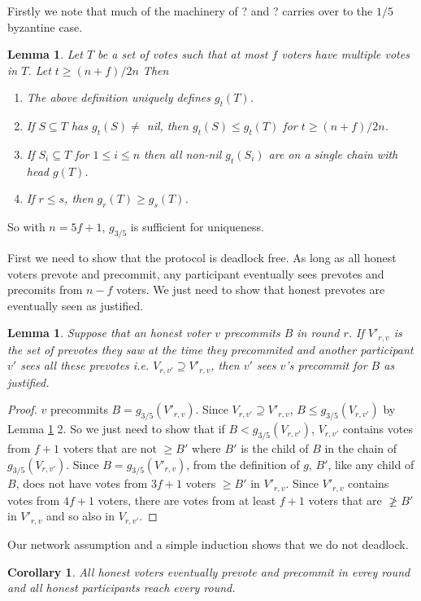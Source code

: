 \documentclass{article}
\newtheorem{lemma}[theorem]{Lemma}
\newtheorem{corollary}[theorem]{Corollary}
\begin{document}
Firstly we note that much of the machinery of ? and ? carries over to the $1/5$ byzantine case.

\begin{lemma} \label{lem:ghost-monotonicity-general}
Let $T$ be a set of votes such that at most $f$ voters have multiple votes in $T$. Let $t \geq (n+f)/2n$ Then
\begin{enumerate}
\item The above definition uniquely defines $g_t(T)$.
\item If $S \subseteq T$ has $g_t(S) \neq$ nil, then $g_t(S) \leq g_t(T)$ for $t \geq (n+f)/2n$.
\item If $S_i \subseteq T$ for $1 \leq i \leq n$ then all non-nil $g_t(S_i)$ are on a single chain with head $g(T)$.
\item If $r \leq s$, then $g_r(T) \geq g_s(T)$.
\end{enumerate}
\end{lemma}
So with $n=5f+1$, $g_{3/5}$ is sufficient for uniqueness.

First we need to show that the protocol is deadlock free.
As long as all honest voters prevote and precommit, any participant eventually sees prevotes and precomits from $n-f$ voters. We just need to show that honest prevotes are eventually seen as justified.
\begin{lemma} Suppose that an honest voter $v$ precommits $B$ in round $r$. If $V'_{r,v}$ is the set of prevotes they saw at the time they precommited and another participant $v'$ sees all these prevotes i.e. $V_{r,v'} \supseteq V'_{r,v}$, then $v'$ sees $v$'s precommit for $B$ as justified. \end{lemma}
\begin{proof} $v$ precommits $B = g_{3/5}(V'_{r,v})$. Since $V_{r,v'} \supseteq V'_{r,v}$, $B \leq g_{3/5}(V_{r,v'})$ by Lemma \ref{lem:ghost-monotonicity-general} 2.
So we just need to show that if  $B < g_{3/5}(V_{r,v'})$, $V_{r,v'}$ contains votes from $f+1$ voters that are not $\geq B'$ where $B'$ is the child of $B$ in the chain of $g_{3/5}(V_{r,v'})$.
Since $B = g_{3/5}(V'_{r,v})$, from the definition of $g$, $B'$, like any child of $B$, does not have votes from $3f+1$ voters $\geq B'$ in $V'_{r,v}$.
Since $V'_{r,v}$ contains votes from $4f+1$ voters, there are votes from at least $f+1$ voters that are $\not \geq B'$ in $V'_{r,v}$ and so also in $V_{r,v'}$.
\end{proof}

Our network assumption and a simple induction shows that we do not deadlock.
\begin{corollary} All honest voters eventually prevote and precommit in evrey round and all honest participants reach every round.\end{corollary}
\end{document}
